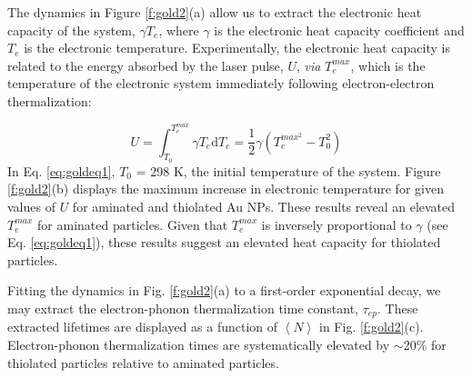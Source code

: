 The dynamics in Figure \ref{f:gold2}(a) allow us to extract the electronic heat capacity of the system, $\gamma T_e$, where $\gamma$ is the electronic heat capacity coefficient and $T_e$ is the electronic temperature. Experimentally, the electronic heat capacity is related to the energy absorbed by the laser pulse, $U$, \emph{via} $T_e^{max}$, which is the temperature of the electronic system immediately following electron-electron thermalization: \par
\begin{equation}\label{eq:goldeq1}
U = \int_{T_0}^{T_e^{max}}\gamma T_e \mathrm{d}T_e = \frac{1}{2}\gamma(T_e^{max^2} - T_0^2)
\end{equation}
In Eq. \ref{eq:goldeq1}, $T_0$ = 298 K, the initial temperature of the system. Figure \ref{f:gold2}(b) displays the maximum increase in electronic temperature for given values of $U$ for aminated and thiolated Au NPs. These results reveal an elevated $T_e^{max}$ for aminated particles. Given that $T_e^{max}$ is inversely proportional to $\gamma$ (see Eq. \ref{eq:goldeq1}), these results suggest an elevated heat capacity for thiolated particles. \par

Fitting the dynamics in Fig. \ref{f:gold2}(a) to a first-order exponential decay, we may extract the electron-phonon thermalization time constant, $\tau_{ep}$. These extracted lifetimes are displayed as a function of $\left\langle N\right\rangle$ in Fig. \ref{f:gold2}(c). Electron-phonon thermalization times are systematically elevated by $\sim$20\% for thiolated particles relative to aminated particles.

